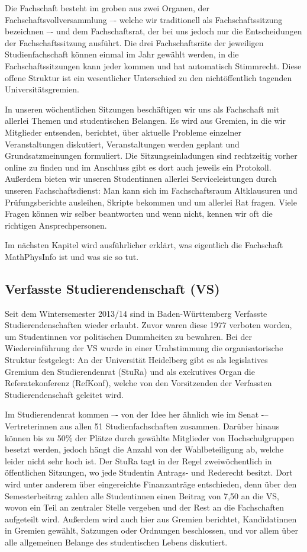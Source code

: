 Die Fachschaft besteht im groben aus zwei Organen, der Fachschaftsvollversammlung –- welche wir traditionell als Fachschaftssitzung bezeichnen –- und dem Fachschaftsrat, der bei uns jedoch nur die Entscheidungen der Fachschaftssitzung ausführt. Die drei Fachschaftsräte der jeweiligen Studienfachschaft können einmal im Jahr gewählt werden, in die Fachschaftssitzungen kann jeder kommen und hat automatisch Stimmrecht. Diese offene Struktur ist ein wesentlicher Unterschied zu den nichtöffentlich tagenden Universitätsgremien. 

In unseren wöchentlichen Sitzungen beschäftigen wir uns als Fachschaft mit allerlei Themen und studentischen Belangen. 
Es wird aus Gremien, in die wir Mitglieder entsenden, berichtet, über aktuelle Probleme einzelner Veranstaltungen diskutiert, Veranstaltungen werden geplant und Grundsatzmeinungen formuliert. Die Sitzungseinladungen sind rechtzeitig vorher online zu finden und im Anschluss gibt es dort auch jeweils ein Protokoll. Außerdem bieten wir unseren Studentinnen allerlei Serviceleistungen durch unseren Fachschaftsdienst: Man kann sich im Fachschaftsraum Altklausuren und Prüfungsberichte ausleihen, Skripte bekommen und um allerlei Rat fragen. Viele Fragen können wir selber beantworten und wenn nicht, kennen wir oft die richtigen Ansprechpersonen.

Im nächsten Kapitel wird ausführlicher erklärt, was eigentlich die Fachschaft MathPhysInfo ist und was sie so tut.

\subsection{Verfasste Studierendenschaft (VS)}
Seit dem Wintersemester 2013/14 sind in Baden-Württemberg Verfasste Studierendenschaften wieder erlaubt. 
Zuvor waren diese 1977 verboten worden, um Studentinnen vor politischen Dummheiten zu bewahren. 
Bei der Wiedereinführung der VS wurde in einer Urabstimmung die organisatorische Struktur festgelegt: 
An der Universität Heidelberg gibt es als legislatives Gremium den Studierendenrat (StuRa) und als exekutives Organ die Referatekonferenz (RefKonf), welche von den Vorsitzenden der Verfassten Studierendenschaft geleitet wird.

Im Studierendenrat kommen –- von der Idee her ähnlich wie im Senat -– Vertreterinnen aus allen 51 Studienfachschaften zusammen. 
Darüber hinaus können bis zu 50\% der Plätze durch gewählte Mitglieder von Hochschulgruppen besetzt werden, jedoch hängt die Anzahl von der Wahlbeteiligung ab, welche leider nicht sehr hoch ist. 
Der StuRa tagt in der Regel zweiwöchentlich in öffentlichen Sitzungen, wo jede Studentin Antrags- und Rederecht besitzt. 
Dort wird unter anderem über eingereichte Finanzanträge entschieden, denn über den Semesterbeitrag zahlen alle Studentinnen einen Beitrag von 7,50 \EUR an die VS, wovon ein Teil an zentraler Stelle vergeben und der Rest an die Fachschaften aufgeteilt wird. 
Außerdem wird auch hier aus Gremien berichtet, Kandidatinnen in Gremien gewählt, Satzungen oder Ordnungen beschlossen, und vor allem über alle allgemeinen Belange des studentischen Lebens diskutiert.

